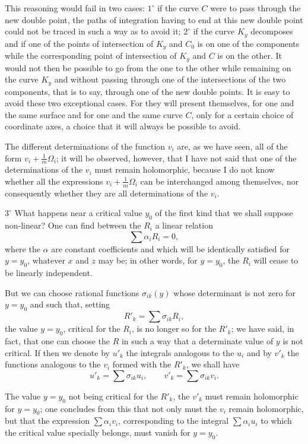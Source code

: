 \documentclass{article}
\begin{document}
This reasoning would fail in two cases: $1^\circ$ if the curve $C$ were to pass through the new double point, the paths of integration having to end at this new double point could not be traced in such a way as to avoid it; $2^\circ$ if the curve $K_{y}$ decomposes and if one of the points of intersection of $K_{y}$ and $C_{0}$ is on one of the components
while the corresponding point of intersection of $K_{y}$ and $C$ is on the other. It would not then be possible to go from the one to the other while remaining on the curve $K_{y}$ and without passing through one of the intersections of the two components, that is to say, through one of the new double points. It is easy to avoid these two exceptional cases. For they will present themselves, for one and the same surface and for one and the same curve $C$, only for a certain choice of coordinate axes, a choice that it will always be possible to avoid.

The different determinations of the function $v_{i}$ are, as we have seen, all of the form $v_{i} + \frac{1}{m} \Omega_{i}$; it will be observed, however, that I have not said that one of the determinations of the $v_{i}$ must remain holomorphic, because I do not know whether all the expressions $v_{i} + \frac{1}{m} \Omega_{i}$ can be interchanged among themselves, nor consequently whether they are all determinations of the $v_{i}$.

$3^\circ$ What happens near a critical value $y_{0}$ of the first kind that we shall suppose non-linear? One can find between the $R_{i}$ a linear relation
\[
\sum \alpha_{i} R_{i} = 0,
\]
where the $\alpha$ are constant coefficients and which will be identically satisfied for $y = y_{0}$, whatever $x$ and $z$ may be; in other words, for $y = y_{0}$, the $R_{i}$ will cease to be linearly independent.

But we can choose rational functions $\sigma_{ik}(y)$ whose determinant is not zero for $y = y_{0}$ and such that, setting
\[
R'_{k} = \sum \sigma_{ik} R_{i},
\]
the value $y = y_{0}$, critical for the $R_{i}$, is no longer so for the $R'_{k}$; we have said, in fact, that one can choose the $R$ in such a way that a determinate value of $y$ is not critical. If then we denote by $u'_{k}$ the integrals analogous to the $u_{i}$ and by $v'_{k}$ the functions analogous to the $v_{i}$ formed with the $R'_{k}$, we shall have
\[
u'_{k} = \sum \sigma_{ik} u_{i}, \qquad v'_{k} = \sum \sigma_{ik} v_{i}.
\]

The value $y = y_{0}$ not being critical for the $R'_{k}$, the $v'_{k}$ must remain holomorphic for $y = y_{0}$; one concludes from this that not only must the $v_{i}$ remain holomorphic, but that the expression $\displaystyle\sum \alpha_{i} v_{i}$, corresponding to the integral $\displaystyle\sum \alpha_{i} u_{i}$ to which the critical value specially belongs, must vanish for $y = y_{0}$.
\end{document}
